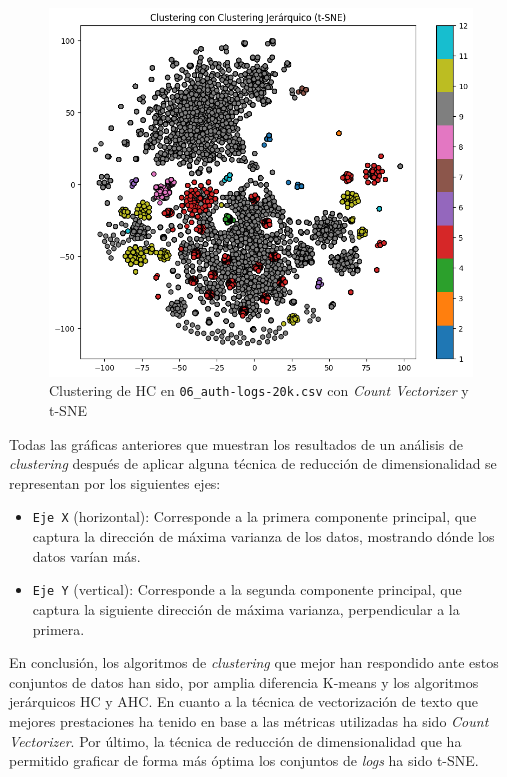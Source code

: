 \begin{figure}[H]
    \centering
    \includegraphics[width=0.675\linewidth]{imagenes/dataset_06_count_vectorizer_t-sne.png}
    \caption{Clustering de \gls{HC} en \texttt{06\_auth-logs-20k.csv} con \textit{Count Vectorizer} y \gls{t-SNE}}
    \label{fig:dataset_06}
\end{figure}

\vspace{-4mm}

Todas las gráficas anteriores que muestran los resultados de un análisis de \textit{clustering} después de aplicar alguna técnica de reducción de dimensionalidad se representan por los siguientes ejes:
\begin{itemize}
    \item \texttt{Eje X} (horizontal): Corresponde a la primera componente principal, que captura la dirección de máxima varianza de los datos, mostrando dónde los datos varían más.
    \item \texttt{Eje Y} (vertical): Corresponde a la segunda componente principal, que captura la siguiente dirección de máxima varianza, perpendicular a la primera. \\
\end{itemize}


En conclusión, los algoritmos de \textit{clustering} que mejor han respondido ante estos conjuntos de datos han sido, por amplia diferencia K-means y los algoritmos jerárquicos \gls{HC} y \gls{AHC}. En cuanto a la técnica de vectorización de texto que mejores prestaciones ha tenido en base a las métricas utilizadas ha sido \textit{Count Vectorizer}. Por último, la técnica de reducción de dimensionalidad que ha permitido graficar de forma más óptima los conjuntos de \textit{logs} ha sido \gls{t-SNE}. 

